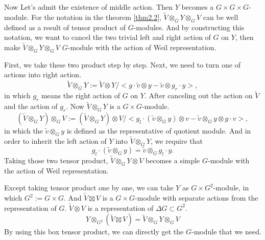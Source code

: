 \documentclass[12pt,a4paper,english]{article}
\theoremstyle{plain}
\theoremstyle{definition}
\begin{document}
Now Let's admit the existence of middle action. Then $Y$ becomes a $G\times G\times G$-module. For the notation in the theorem \ref{thm2.2}, $\tilde{V}\otimes_{G}Y\otimes_{G}V$ can be well defined as a result of tensor product of $ G$-modules. And by constructing this notation, we want to cancel the two trivial left and right action of $G$ on $Y$, then make $\tilde{V}\otimes_{G}Y\otimes_{G}V$ $G$-module with the action of Weil representation.



First, we take these two product step by step. Next, we need to turn one of actions into right action. 
\begin{equation*}
    \tilde{V}\otimes_{G}Y := \tilde{V}\otimes Y/<g\cdot\tilde{v}\otimes y-\tilde{v}\otimes g_{r}\cdot y>,
\end{equation*}
in which $g_{r}$ means the right action of $G$ on $Y$. After canceling out the action on $\tilde{V}$ and the action of $g_{r}$. Now $\tilde{V}\otimes_{G}Y$ is a $G\times G$-module.
\begin{equation*}
    (\tilde{V}\otimes_{G}Y)\otimes_{G} V:= (\tilde{V}\otimes_{G}Y)\otimes V/<g_{l}\cdot(\tilde{v}\otimes_{G} y)\otimes v-\tilde{v}\otimes_{G} y\otimes g\cdot v>,
\end{equation*}
in which the $\tilde{v}\otimes_{G} y$ is defined as the representative of quotient module. And in order to inherit the left action of $Y$ into $\tilde{V}\otimes_{G}Y$, we require that
\begin{equation*}
    g_{l}\cdot(\tilde{v}\otimes_{G} y)=\tilde{v}\otimes_{G} g_{l}\cdot y.
\end{equation*}
Taking those two tensor product, $\tilde{V}\otimes_{G}Y\otimes V$ becomes a simple $G$-module with the action of Weil representation.

Except taking tensor product one by one, we can take $Y$ as $G\times G^{2}$-module, in which $G^{2}:=G\times G$. And $\tilde{V}\boxtimes V$ is a $G\times G$-module with separate actions from the representation of $G$. $\tilde{V}\otimes V$ is a representation of $\Delta G\subset G^{2}$.
\begin{equation*}
    Y\otimes_{G^{2}} (\tilde{V}\boxtimes V)=\tilde{V}\otimes_{G} Y\otimes_{G} V
\end{equation*}
By using this box tensor product, we can directly get the $G$-module that we need.
\end{document}
